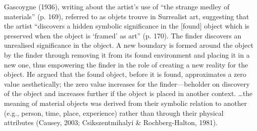 Gascoygne (1936), writing about the artist’s use of “the strange medley of materials” (p. 169), referred to as objets trouve in Surrealist art, suggesting that the artist “discovers a hidden symbolic significance in the [found] object which is preserved when the object is ‘framed’ as art” (p. 170). The finder discovers an unrealised significance in the object. A new boundary is formed around the object by the finder through removing it from its found environment and placing it in a new one, thus empowering the finder in the role of creating a new reality for the object. He argued that the found object, before it is found, approximates a zero value aesthetically; the zero value increases for the finder---beholder on discovery of the object and increases further if the object is placed in another context. \ldots the meaning of material objects was derived from their symbolic relation to another (e.g., person, time, place, experience) rather than through their physical attributes (Causey, 2003; Csikszentmihalyi \& Rochberg-Halton, 1981). 





